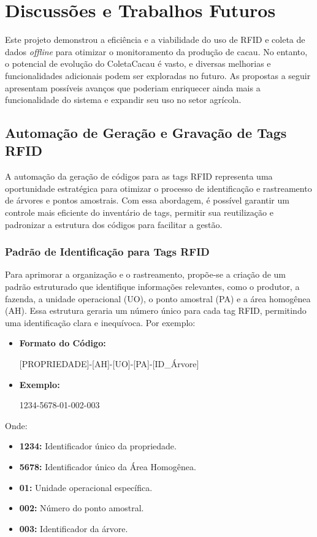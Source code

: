 \chapter{Discussões e Trabalhos Futuros}
Este projeto demonstrou a eficiência e a viabilidade do uso de RFID e coleta de dados \textit{offline} para otimizar o monitoramento da produção de cacau. No entanto, o potencial de evolução do ColetaCacau é vasto, e diversas melhorias e funcionalidades adicionais podem ser exploradas no futuro. As propostas a seguir apresentam possíveis avanços que poderiam enriquecer ainda mais a funcionalidade do sistema e expandir seu uso no setor agrícola.

\section{Automação de Geração e Gravação de Tags RFID}

A automação da geração de códigos para as tags RFID representa uma oportunidade estratégica para otimizar o processo de identificação e rastreamento de árvores e pontos amostrais. Com essa abordagem, é possível garantir um controle mais eficiente do inventário de tags, permitir sua reutilização e padronizar a estrutura dos códigos para facilitar a gestão.

\subsection{Padrão de Identificação para Tags RFID}

Para aprimorar a organização e o rastreamento, propõe-se a criação de um padrão estruturado que identifique informações relevantes, como o produtor, a fazenda, a unidade operacional (UO), o ponto amostral (PA) e a área homogênea (AH). Essa estrutura geraria um número único para cada tag RFID, permitindo uma identificação clara e inequívoca. Por exemplo:

\begin{itemize}
    \item \textbf{Formato do Código:} 
    \begin{center}
    [PROPRIEDADE]-[AH]-[UO]-[PA]-[ID\_Árvore]
    \end{center}
    \item \textbf{Exemplo:} 
    \begin{center}
    1234-5678-01-002-003
    \end{center}
\end{itemize}

\noindent Onde:
\begin{itemize}
    \item \textbf{1234:} Identificador único da propriedade.
    \item \textbf{5678:} Identificador único da Área Homogênea.
    \item \textbf{01:} Unidade operacional específica.
    \item \textbf{002:} Número do ponto amostral.
    \item \textbf{003:} Identificador da árvore.
\end{itemize}

